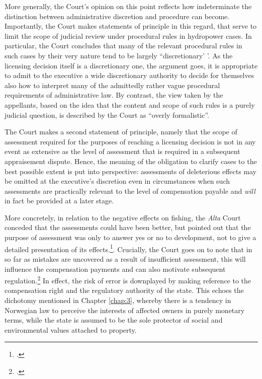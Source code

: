 More generally, the Court's opinion on this point reflects how indeterminate the distinction between administrative discretion and procedure can become. Importantly, the Court makes statements of principle in this regard, that serve to limit the scope of judicial review under procedural rules in hydropower cases. In particular, the Court concludes that many of the relevant procedural rules in such cases by their very nature tend to be largely ``discretionary' '. As the licensing decision itself is a discretionary one, the argument goes, it is appropriate to admit to the executive a wide discretionary authority to decide for themselves also how to interpret many of the admittedly rather vague procedural requirements of administrative law. By contrast, the view taken by the appellants, based on the idea that the content and scope of such rules is a purely judicial question, is described by the Court as ``overly formalistic''.

The Court makes a second statement of principle, namely that the scope of assessment required for the purposes of reaching a licensing decision is not in any event as extensive as the level of assessment that is required in a subsequent appraisement dispute. Hence, the meaning of the obligation to clarify cases to the best possible extent is put into perspective: assessments of deleterious effects may be omitted at the executive's discretion even in circumstances when such assessments are practically relevant to the level of compensation payable and {\it will} in fact be provided at a later stage.

More concretely, in relation to the negative effects on fishing, the {\it Alta} Court conceded that the assessments could have been better, but pointed out that the purpose of assessment was only to answer yes or no to development, not to give a detailed presentation of its effects.\footcite[330]{alta82}. Crucially, the Court goes on to note that in so far as mistakes are uncovered as a result of insufficient assessment, this will influence the compensation payments and can also motivate subsequent regulation.\footcite[330]{alta82} In effect, the risk of error is downplayed by making reference to the compensation right and the regulatory authority of the state. This echoes the dichotomy mentioned in Chapter \ref{chap:3}, whereby there is a tendency in Norwegian law to perceive the interests of affected owners in purely monetary terms, while the state is assumed to be the sole protector of social and environmental values attached to property.

